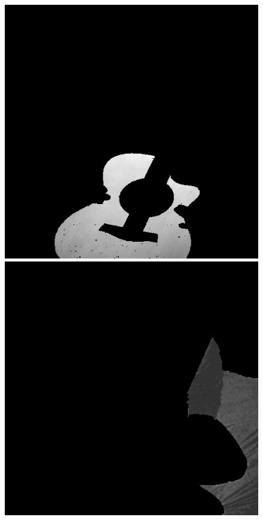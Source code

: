 \begin{figure}[ht]
\begin{minipage}[b]{0.47\linewidth}
\includegraphics[width=\textwidth]{MSTseg2.jpg}
\end{minipage}
\begin{minipage}[b]{0.47\linewidth}
\centering
\includegraphics[width=\textwidth]{MSTseg3.jpg}

\end{minipage}
\end{figure}
